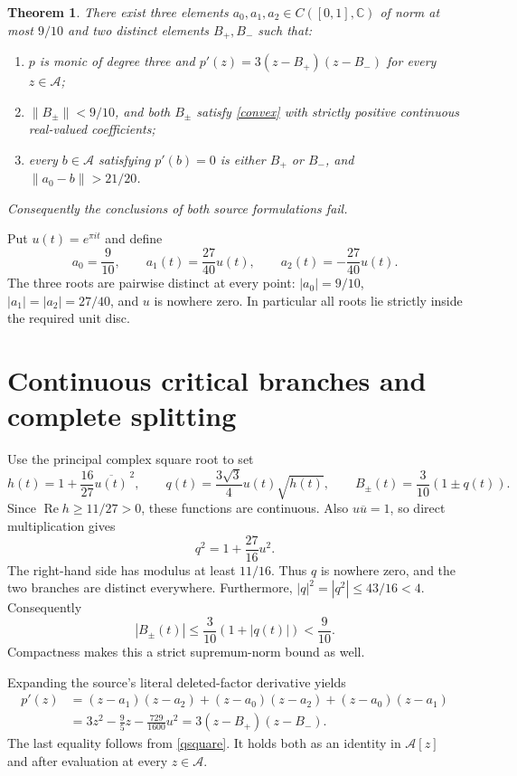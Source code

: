 \documentclass[11pt]{article}
\newtheorem{theorem}{Theorem}
\newcommand{\A}{\mathcal A}
\begin{document}
\begin{theorem}\label{main}
There exist three elements $a_0,a_1,a_2\in C([0,1],\mathbb C)$ of norm
at most $9/10$ and two distinct elements $B_+,B_-$ such that:
\begin{enumerate}
\item $p$ is monic of degree three and
$p'(z)=3(z-B_+)(z-B_-)$ for every $z\in\A$;
\item $\|B_\pm\|<9/10$, and both $B_\pm$ satisfy \eqref{convex} with
strictly positive continuous real-valued coefficients;
\item every $b\in\A$ satisfying $p'(b)=0$ is either $B_+$ or $B_-$, and
$\|a_0-b\|>21/20$.
\end{enumerate}
Consequently the conclusions of both source formulations fail.
\end{theorem}

Put $u(t)=e^{\pi it}$ and define
\begin{equation}\label{roots}
 a_0=\frac9{10},\qquad a_1(t)=\frac{27}{40}u(t),\qquad
 a_2(t)=-\frac{27}{40}u(t).
\end{equation}
The three roots are pairwise distinct at every point: $|a_0|=9/10$,
$|a_1|=|a_2|=27/40$, and $u$ is nowhere zero.
In particular all roots lie strictly inside the required unit disc.

\section{Continuous critical branches and complete splitting}
Use the principal complex square root to set
\begin{equation}\label{branches}
 h(t)=1+\frac{16}{27}\overline{u(t)}^{\,2},\qquad
 q(t)=\frac{3\sqrt3}{4}u(t)\sqrt{h(t)},\qquad
 B_\pm(t)=\frac3{10}(1\pm q(t)).
\end{equation}
Since $\operatorname{Re}h\ge11/27>0$, these functions are continuous.
Also $u\overline u=1$, so direct multiplication gives
\begin{equation}\label{qsquare}
 q^2=1+\frac{27}{16}u^2.
\end{equation}
The right-hand side has modulus at least $11/16$. Thus $q$ is nowhere
zero, and the two branches are distinct everywhere. Furthermore,
$|q|^2=|q^2|\le43/16<4$. Consequently
\[
 |B_\pm(t)|\le\frac3{10}(1+|q(t)|)<\frac9{10}.
\]
Compactness makes this a strict supremum-norm bound as well.

Expanding the source's literal deleted-factor derivative yields
\begin{align*}
 p'(z)&=(z-a_1)(z-a_2)+(z-a_0)(z-a_2)+(z-a_0)(z-a_1)\\
 &=3z^2-\frac95z-\frac{729}{1600}u^2
 =3(z-B_+)(z-B_-).
\end{align*}
The last equality follows from \eqref{qsquare}. It holds both as an identity
in $\A[z]$ and after evaluation at every $z\in\A$.
\end{document}
